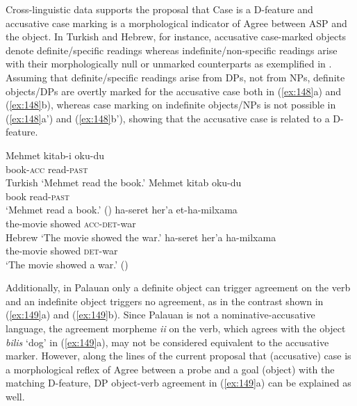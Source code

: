 Cross-linguistic data supports the proposal that Case is a D-feature and accusative case marking is a morphological indicator of Agree between \ac{ASP} and the object. In Turkish and Hebrew, for instance, accusative case-marked objects denote definite/specific readings whereas indefinite/non-specific readings arise with their morphologically null or unmarked counterparts as exemplified in . Assuming that definite/specific readings arise from DPs, not from \acp{NP}, definite objects/DPs are overtly marked for the accusative case both in (\ref{ex:148}a) and (\ref{ex:148}b), whereas case marking on indefinite objects/\acp{NP} is not possible in (\ref{ex:148}a') and (\ref{ex:148}b'), showing that the accusative case is related to a D-feature. 

\begin{exe}\ex\label{ex:148}
\begin{xlist}
    \ex\label{ex:148a} \gll Mehmet kitab-i oku-du      \\
    {} book-\textsc{acc} read-\textsc{past} \\
    \hspace*{\fill} Turkish
    \glt  ‘Mehmet read the book.’
     \gll  Mehmet kitab oku-du      \\
     {} book read-\textsc{past} \\
    \glt  ‘Mehmet read a book.’ (\citealt{NagaOzcelik2012})
    \ex\label{ex:148b} \gll ha-seret    her’a     et-ha-milxama  \\
    the-movie showed \textsc{acc}-\textsc{det-}war\\ 
    \hspace*{\fill} Hebrew
    \glt  ‘The movie showed the war.’
     \gll ha-seret    her’a     ha-milxama  \\
    the-movie showed \textsc{det-}war \\
    \glt   ‘The movie showed a war.’  (\citealt{Aissen2003})
\end{xlist}
\end{exe}

Additionally, in Palauan only a definite object can trigger agreement on the verb and an indefinite object triggers no agreement, as in the contrast shown in (\ref{ex:149}a) and (\ref{ex:149}b). Since Palauan is not a nominative-accusative language, the agreement morpheme \textit{ii} on the verb, which agrees with the object \textit{bilis} ‘dog’ in (\ref{ex:149}a), may not be considered equivalent to the accusative marker. However, along the lines of the current proposal that (accusative) case is a morphological reflex of Agree between a probe and a goal (object) with the matching D-feature, \ac{DP} object-verb agreement in (\ref{ex:149}a) can be explained as well. 

